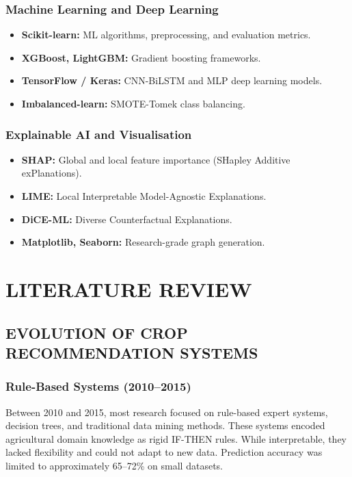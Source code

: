 \documentclass[12pt,a4paper,oneside]{report}
\begin{document}
\subsection{Machine Learning and Deep Learning}
\begin{itemize}[leftmargin=*, label=$\bullet$]
  \item \textbf{Scikit-learn:} ML algorithms, preprocessing, and evaluation metrics.
  \item \textbf{XGBoost, LightGBM:} Gradient boosting frameworks.
  \item \textbf{TensorFlow / Keras:} CNN-BiLSTM and MLP deep learning models.
  \item \textbf{Imbalanced-learn:} SMOTE-Tomek class balancing.
\end{itemize}

\subsection{Explainable AI and Visualisation}
\begin{itemize}[leftmargin=*, label=$\bullet$]
  \item \textbf{SHAP:} Global and local feature importance (SHapley Additive exPlanations).
  \item \textbf{LIME:} Local Interpretable Model-Agnostic Explanations.
  \item \textbf{DiCE-ML:} Diverse Counterfactual Explanations.
  \item \textbf{Matplotlib, Seaborn:} Research-grade graph generation.
\end{itemize}

\chapter{LITERATURE REVIEW}

\section{EVOLUTION OF CROP RECOMMENDATION SYSTEMS}

\subsection{Rule-Based Systems (2010--2015)}
Between 2010 and 2015, most research focused on rule-based expert systems, decision trees, and traditional data mining methods. These systems encoded agricultural domain knowledge as rigid IF-THEN rules. While interpretable, they lacked flexibility and could not adapt to new data. Prediction accuracy was limited to approximately 65--72\% on small datasets.
\end{document}
